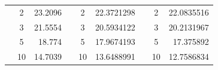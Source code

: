 \begin{table}[]
\begin{tabular}{|ccrccrccr|}
\rowcolor[HTML]{DDFDFF} 
\multicolumn{1}{|c|}{\cellcolor[HTML]{FFFFC7}}                                & \multicolumn{1}{c|}{\cellcolor[HTML]{DDFDFF}2}         & \multicolumn{1}{r|}{\cellcolor[HTML]{DDFDFF}23.2096}    & \multicolumn{1}{c|}{\cellcolor[HTML]{FFFFC7}}                                & \multicolumn{1}{c|}{\cellcolor[HTML]{DDFDFF}2}         & \multicolumn{1}{r|}{\cellcolor[HTML]{DDFDFF}22.3721298} & \multicolumn{1}{c|}{\cellcolor[HTML]{FFFFC7}}                                & \multicolumn{1}{c|}{\cellcolor[HTML]{DDFDFF}2}         & 22.0835516                                              \\ \cline{2-3} \cline{5-6} \cline{8-9} 
\rowcolor[HTML]{DAE8FC} 
\multicolumn{1}{|c|}{\cellcolor[HTML]{FFFFC7}}                                & \multicolumn{1}{c|}{\cellcolor[HTML]{DAE8FC}3}         & \multicolumn{1}{r|}{\cellcolor[HTML]{DAE8FC}21.5554}    & \multicolumn{1}{c|}{\cellcolor[HTML]{FFFFC7}}                                & \multicolumn{1}{c|}{\cellcolor[HTML]{DAE8FC}3}         & \multicolumn{1}{r|}{\cellcolor[HTML]{DAE8FC}20.5934122} & \multicolumn{1}{c|}{\cellcolor[HTML]{FFFFC7}}                                & \multicolumn{1}{c|}{\cellcolor[HTML]{DAE8FC}3}         & 20.2131967                                              \\ \cline{2-3} \cline{5-6} \cline{8-9} 
\rowcolor[HTML]{DDFDFF} 
\multicolumn{1}{|c|}{\cellcolor[HTML]{FFFFC7}}                                & \multicolumn{1}{c|}{\cellcolor[HTML]{DDFDFF}5}         & \multicolumn{1}{r|}{\cellcolor[HTML]{DDFDFF}18.774}     & \multicolumn{1}{c|}{\cellcolor[HTML]{FFFFC7}}                                & \multicolumn{1}{c|}{\cellcolor[HTML]{DDFDFF}5}         & \multicolumn{1}{r|}{\cellcolor[HTML]{DDFDFF}17.9674193} & \multicolumn{1}{c|}{\cellcolor[HTML]{FFFFC7}}                                & \multicolumn{1}{c|}{\cellcolor[HTML]{DDFDFF}5}         & 17.375892                                               \\ \cline{2-3} \cline{5-6} \cline{8-9} 
\rowcolor[HTML]{DAE8FC} 
\multicolumn{1}{|c|}{\cellcolor[HTML]{FFFFC7}}                                & \multicolumn{1}{c|}{\cellcolor[HTML]{DAE8FC}10}        & \multicolumn{1}{r|}{\cellcolor[HTML]{DAE8FC}14.7039}    & \multicolumn{1}{c|}{\cellcolor[HTML]{FFFFC7}}                                & \multicolumn{1}{c|}{\cellcolor[HTML]{DAE8FC}10}        & \multicolumn{1}{r|}{\cellcolor[HTML]{DAE8FC}13.6488991} & \multicolumn{1}{c|}{\cellcolor[HTML]{FFFFC7}}                                & \multicolumn{1}{c|}{\cellcolor[HTML]{DAE8FC}10}        & 12.7586834                                              \\ \cline{2-3} \cline{5-6} \cline{8-9} 

\end{tabular}
\end{table}
